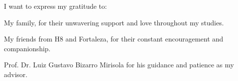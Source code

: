 I want to express my gratitude to:

My family, for their unwavering support and love throughout my studies.

My friends from H8 and Fortaleza, for their constant encouragement and companionship.

Prof. Dr. Luiz Gustavo Bizarro Mirisola for his guidance and patience as my advisor.